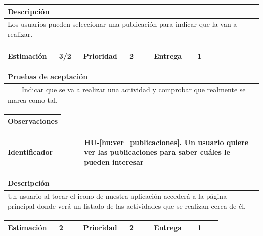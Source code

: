 \documentclass[11pt]{article}
\newcommand{\tabitem}{~~\llap{\textbullet}~~}
\begin{document}
  \begin{longtable}{p{1.028\linewidth}}
    \textbf{Descripción}\\
    \midrule
    Los usuarios pueden seleccionar una publicación para indicar que la van a realizar. 
  \end{longtable}
  \begin{longtable}{p{0.18\linewidth}|p{0.1\linewidth}|p{0.18\linewidth}|p{0.1\linewidth}|p{0.18\linewidth}|p{0.1\linewidth}}
    \toprule
    \textbf{Estimación} & 3/2 & \textbf{Prioridad} & 2 & \textbf{Entrega} & 1 \\
    \bottomrule
  \end{longtable}

  \begin{longtable}{p{1.028\linewidth}}
    \textbf{Pruebas de aceptación}\\
    \midrule
    \tabitem Indicar que se va a realizar una actividad y comprobar que realmente se marca como tal.\\
\end{longtable}
\begin{longtable}{p{1.028\linewidth}}
  \textbf{Observaciones}\\
  \midrule
  \bottomrule
  \bottomrule
\end{longtable}


  \centering
  \begin{longtable}{p{0.3\linewidth}|p{0.7\linewidth}}
    \toprule
    \toprule
    \textbf{Identificador} & \textbf{HU-\ref{hu:ver_publicaciones}}. Un usuario quiere ver las publicaciones para saber cuáles le pueden interesar\\
    
    \bottomrule
  \end{longtable}

  \begin{longtable}{p{1.028\linewidth}}
    \textbf{Descripción}\\
    \midrule
    Un usuario al tocar el icono de nuestra aplicación accederá a la página principal donde verá un listado de las actividades que se realizan cerca de él.
  \end{longtable}
  \begin{longtable}{p{0.18\linewidth}|p{0.1\linewidth}|p{0.18\linewidth}|p{0.1\linewidth}|p{0.18\linewidth}|p{0.1\linewidth}}
    \toprule
    \textbf{Estimación} & 2 & \textbf{Prioridad} & 2 & \textbf{Entrega} & 1 \\
    \bottomrule
  \end{longtable}
\end{document}

